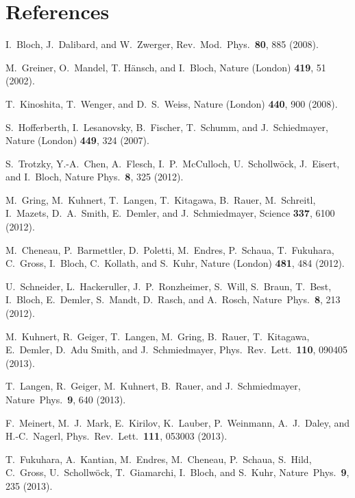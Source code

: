 \documentclass[11pt]{iopart}
\begin{document}
\section*{References}
\begin{thebibliography}{99}


I.~Bloch, J.~Dalibard, and W.~Zwerger, Rev.\ Mod.\ Phys.\ {\bf 80},
885 (2008).

M.~Greiner, O.~Mandel, T. H\"ansch, and I.~Bloch, Nature (London)
{\bf 419}, 51 (2002).

T.~Kinoshita, T.~Wenger, and D.~S.~Weiss, Nature (London) {\bf 440},
900 (2008).

S.~Hofferberth, I.~Lesanovsky, B.~Fischer, T.~Schumm, and J.~Schiedmayer,
Nature (London) {\bf 449}, 324 (2007).

S.~Trotzky, Y.-A.~Chen, A.~Flesch, I.~P.~McCulloch, U.~Schollw\"ock,
J.~Eisert, and I.~Bloch, Nature Phys.\ {\bf 8}, 325 (2012).

M.~Gring, M.~Kuhnert, T.~Langen, T.~Kitagawa, B.~Rauer, M.~Schreitl,
I.~Mazets, D.~A.~Smith, E.~Demler, and J.~Schmiedmayer, Science {\bf 337},
6100 (2012).

M.~Cheneau, P.~Barmettler, D.~Poletti, M.~Endres, P.~Schaua, T.~Fukuhara,
C.~Gross, I.~Bloch, C.~Kollath, and S.~Kuhr, Nature (London) {\bf 481},
484 (2012).

U.~Schneider, L.~Hackeruller, J.~P.~Ronzheimer, S.~Will, S.~Braun, T.~Best,
I.~Bloch, E.~Demler, S.~Mandt, D.~Rasch, and A.~Rosch, Nature\ Phys.\
{\bf 8}, 213 (2012).

M.~Kuhnert, R.~Geiger, T.~Langen, M.~Gring, B.~Rauer,
T.~Kitagawa, E.~Demler, D.~Adu Smith, and J.~Schmiedmayer, Phys.\ Rev.\
Lett.\ {\bf 110}, 090405 (2013).

T.~Langen, R.~Geiger, M.~Kuhnert, B.~Rauer, and J.~Schmiedmayer,
Nature\ Phys.\ {\bf 9}, 640 (2013).

F.~Meinert, M.~J.~Mark, E.~Kirilov, K.~Lauber, P.~Weinmann,
A.~J.~Daley, and H.-C.~Nagerl, Phys.\ Rev.\ Lett.\ {\bf 111},
053003 (2013).

T.~Fukuhara, A.~Kantian, M.~Endres, M.~Cheneau, P.~Schaua, S.~Hild, C.~Gross,
U.~Schollw\"ock, T.~Giamarchi, I.~Bloch, and S.~Kuhr, Nature\ Phys.\ {\bf 9},
235 (2013).


\end{thebibliography}
\end{document}
